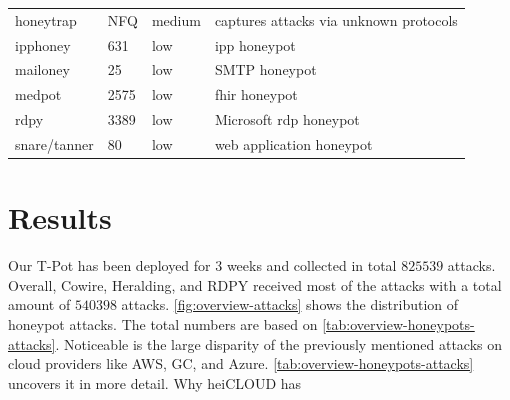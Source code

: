 \begin{table}
\begin{tabularx}{\linewidth}{l|XlX}
        honeytrap \cite{honeytrap2021}           & NFQ                                                                                                         & medium                     & captures attacks via unknown protocols                                               \\
        ipphoney \cite{ipphoney2021}             & 631                                                                                                         & low                        & \ac{ipp} honeypot                                                                    \\
        mailoney                                 & 25                                                                                                          & low                        & SMTP honeypot                                                                        \\
        medpot \cite{medpot2021}                 & 2575                                                                                                        & low                        & \ac{fhir} honeypot                                                                   \\
        rdpy \cite{rdpy2021}                     & 3389                                                                                                        & low                        & Microsoft \ac{rdp} honeypot                                                          \\
        snare/tanner \cite{snare2021}            & 80                                                                                                          & low                        & web application honeypot                                                             \\
        \bottomrule
    \end{tabularx}
    \label{tab:overview-honeypots}
\end{table}

\section{Results}
\label{sec:honeypots-heicloud}

Our T-Pot has been deployed for 3 weeks and collected in total $825539$ attacks.
Overall, Cowire, Heralding, and RDPY received most of the attacks with a total amount of $540398$ attacks.
\autoref{fig:overview-attacks} shows the distribution of honeypot attacks.
The total numbers are based on \autoref{tab:overview-honeypots-attacks}.
Noticeable is the large disparity of the previously mentioned attacks on cloud providers like AWS, GC, and Azure.
\autoref{tab:overview-honeypots-attacks} uncovers it in more detail.
Why heiCLOUD has 

